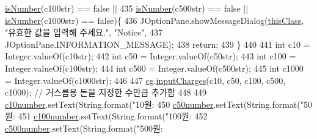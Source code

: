 \begin{DoxyCode}
{{{{{{{{{{{{{{{{{{{{{{{{{{{{{{{{{{{{{{{{{{{{{{{{{{{{{{      \hyperlink{class_vending_machine_1_1_machine_u_i_a7f5aa2e1b49c150c3b479b7e5123cf25}{isNumber}(c100str) == \textcolor{keyword}{false} || 
435                         \hyperlink{class_vending_machine_1_1_machine_u_i_a7f5aa2e1b49c150c3b479b7e5123cf25}{isNumber}(c500str) == \textcolor{keyword}{false} || \hyperlink{class_vending_machine_1_1_machine_u_i_a7f5aa2e1b49c150c3b479b7e5123cf25}{isNumber}(c1000str) == \textcolor{keyword}{false})\{
436                     JOptionPane.showMessageDialog(\hyperlink{class_vending_machine_1_1_machine_u_i_a0d705e137d12427a9af68595eb2be582}{thisClass}, \textcolor{stringliteral}{"유효한 값을 입력해 주세요."}, \textcolor{stringliteral}{"Notice"}, 
437                             JOptionPane.INFORMATION\_MESSAGE);
438                     \textcolor{keywordflow}{return};
439                 \}
440                 
441                 \textcolor{keywordtype}{int} c10 = Integer.valueOf(c10str);
442                 \textcolor{keywordtype}{int} c50 = Integer.valueOf(c50str);
443                 \textcolor{keywordtype}{int} c100 = Integer.valueOf(c100str);
444                 \textcolor{keywordtype}{int} c500 = Integer.valueOf(c500str);
445                 \textcolor{keywordtype}{int} c1000 = Integer.valueOf(c1000str);
446                 
447                 \hyperlink{class_vending_machine_1_1_machine_u_i_a3aacb919b7c540d71bb398666f03dc08}{cg}.\hyperlink{class_vending_machine_1_1_change_a47e92d2372d5b1f2a3e948ee4f55d884}{inputCharges}(c10, c50, c100, c500, c1000);  \textcolor{comment}{// 거스름용 돈을 지정한 수만큼 추가함}
448                 
449                 \hyperlink{class_vending_machine_1_1_machine_u_i_a87030fea4819a0534fe536af2084a6e5}{c10number}.setText(String.format(\textcolor{stringliteral}{"10원: %
450                 \hyperlink{class_vending_machine_1_1_machine_u_i_a41f6d6db82cc6d27f2961c71d8fff229}{c50number}.setText(String.format(\textcolor{stringliteral}{"50원: %
451                 \hyperlink{class_vending_machine_1_1_machine_u_i_a3541b20a550888418c19ed32a0d7ac10}{c100number}.setText(String.format(\textcolor{stringliteral}{"100원: %
452                 \hyperlink{class_vending_machine_1_1_machine_u_i_ab6f47810cb959c1353a04f8aba54ae21}{c500number}.setText(String.format(\textcolor{stringliteral}{"500원: %
}}}}}}}}}}}}}}}}}}}}}}}}}}}}}}}}}}}}}}}}}}}}}}}}}}}}}}}}}}
\end{DoxyCode}

